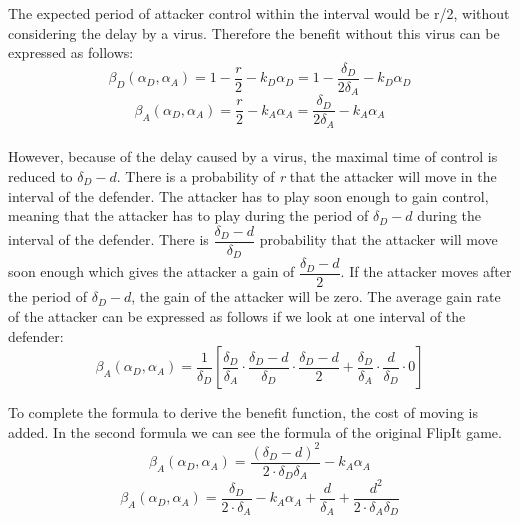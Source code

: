 The expected period of attacker control within the interval would be r/2, without considering the delay by a virus. Therefore the benefit without this virus can be expressed as follows:
\begin{equation}\label{first}
\beta_{D}(\alpha_{D},\alpha_{A}) =1 -  \dfrac {r} {2} - k_{D} \alpha_{D} = 1 - \dfrac {\delta_{D}} {2\delta_{A}} - k_{D} \alpha_{D} 
\end{equation}
\begin{equation}\label{first}
\beta_{A}(\alpha_{D},\alpha_{A}) =\dfrac {r} {2} - k_{A} \alpha_{A} = \dfrac {\delta_{D}} {2\delta_{A}} - k_{A} \alpha_{A}  
\end{equation}\\

However, because of the delay caused by a virus, the maximal time of control is reduced to $\delta_{D}-d$. There is a probability of \textit{r} that the attacker will move in the interval of the defender. The attacker has to play soon enough to gain control, meaning that the attacker has to play during the period of $\delta_{D}-d$ during the interval of the defender. There is $\dfrac{\delta_{D}-d}{\delta_{D}}$ probability that the attacker will move soon enough which gives the attacker a gain of $\dfrac{\delta_{D}-d}{2}$. If the attacker moves after the period of $\delta_{D}-d$, the gain of the attacker will be zero. The average gain rate of the attacker can be expressed as follows if we look at one interval of the defender:
\begin{equation}\label{first}
\beta_{A}(\alpha_{D},\alpha_{A}) = \dfrac {1}{\delta_{D}} [ \dfrac{\delta_{D}}{\delta_{A}} \cdot \dfrac{\delta_{D}-d}{\delta_{D}} \cdot \dfrac{\delta_{D}-d}{2} + \dfrac{\delta_{D}}{\delta_{A}} \cdot \dfrac{d}{\delta_{D}} \cdot 0 ]
\end{equation}

To complete the formula to derive the benefit function, the cost of moving is added. In the second formula we can see the formula of the original FlipIt game.
\begin{equation}\label{first}
\beta_{A}(\alpha_{D},\alpha_{A}) = \dfrac { (\delta_{D}-d) ^{2}} {2 \cdot \delta_{D}  \delta_{A}} - k_{A} \alpha_{A}
\end{equation}
\begin{equation}\label{first}
\beta_{A}(\alpha_{D},\alpha_{A}) = \dfrac { \delta_{D}} {2 \cdot \delta_{A}} - k_{A} \alpha_{A} + \dfrac{d}{\delta_{A}} + \dfrac{d^{2}}{2 \cdot \delta_{A} \delta_{D}}
\end{equation}
 
